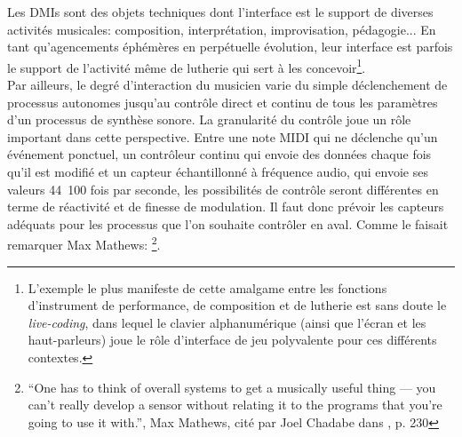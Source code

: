 \noindent Les \glspl{DMI} sont des objets techniques dont l'interface est le support de diverses activités musicales: composition, interprétation, improvisation, pédagogie... En tant qu'agencements éphémères en perpétuelle évolution, leur interface est parfois le support de l'activité même de lutherie qui sert à les concevoir\footnote{L'exemple le plus manifeste de cette amalgame entre les fonctions d'instrument de performance, de composition et de lutherie est sans doute le \textit{live-coding}, dans lequel le clavier alphanumérique (ainsi que l'écran et les haut-parleurs) joue le rôle d'interface de jeu polyvalente pour ces différents contextes.}.\\
\indent Par ailleurs, le degré d'interaction du musicien varie du simple déclenchement de processus autonomes jusqu'au contrôle direct et continu de tous les paramètres d'un processus de synthèse sonore.
La granularité du contrôle joue un rôle important dans cette perspective. Entre une note \gls{MIDI} qui ne déclenche qu'un événement ponctuel, un contrôleur continu qui envoie des données chaque fois qu'il est modifié et un capteur échantillonné à fréquence audio, qui envoie ses valeurs 44~100 fois par seconde, les possibilités de contrôle seront différentes en terme de réactivité et de finesse de modulation. Il faut donc prévoir les capteurs adéquats pour les processus que l'on souhaite contrôler en aval. Comme le faisait remarquer Max Mathews: \footnote{``One has to think of overall systems to get a musically useful thing — you can't really develop a sensor without relating it to the programs that you're going to use it with.'', Max Mathews, cité par Joel Chadabe dans \cite{chadabe_electric_1996}, p. 230}.\\
